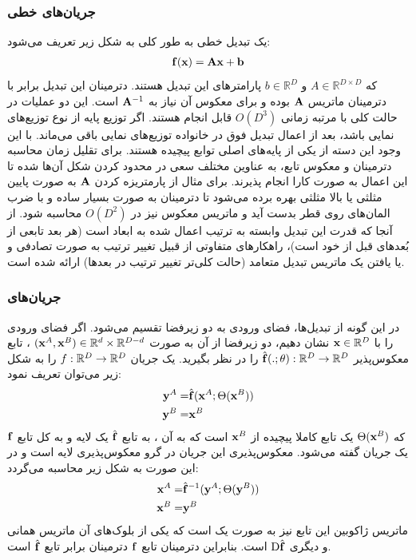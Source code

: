 \subsubsection{جریان‌های خطی}
یک تبدیل خطی به طور کلی به شکل زیر تعریف می‌شود:
\begin{align}
	{\bf f}({\bf x}) = {\bf A}{\bf x} + {\bf b}
\end{align}
که $A \in \mathbb{R}^{D \times D}$ و $b \in \mathbb{R}^D$ پارامتر‌های این تبدیل هستند. دترمینان این تبدیل برابر با دترمینان ماتریس ${\bf A}$ بوده و برای معکوس آن نیاز به ${\bf A}^{-1}$ است.
این دو عملیات در حالت کلی با مرتبه زمانی
$O(D^3)$
قابل انجام هستند. اگر توزیع پایه از نوع توزیع‌های نمایی باشد، بعد از اعمال تبدیل فوق در خانواده توزیع‌های نمایی باقی می‌ماند. با این وجود این دسته از یکی از پایه‌های اصلی توابع پیچیده هستند. برای تقلیل زمان محاسبه دترمینان و معکوس تابع، به عناوین مختلف سعی در محدود کردن شکل آن‌ها شده تا این اعمال به صورت کارا انجام پذیرند. برای مثال از پارمتریزه کردن ${\bf A}$ به صورت پایین مثلثی یا بالا مثلثی بهره برده می‌شود تا دترمینان به صورت بسیار ساده و با ضرب المان‌های روی قطر بدست آید و ماتریس معکوس نیز در $O(D^2)$ محاسبه شود. از آنجا که قدرت این تبدیل وابسته به ترتیب اعمال شده به ابعاد است (هر بعد تابعی از بُعدهای قبل از خود است)، راهکارهای متفاوتی از قبیل تغییر ترتیب به صورت تصادفی و یا یافتن یک ماتریس تبدیل متعامد (حالت کلی‌تر تغییر ترتیب در بعدها) ارائه شده است.
\subsubsection{جریان‌های
}
در این گونه از تبدیل‌ها، فضای ورودی به دو زیرفضا تقسیم می‌شود. اگر فضای ورودی را با
${\bf x} \in {\mathbb{R}}^D$
نشان دهیم، دو زیرفضا از آن به صورت
$({\bf x}^A, {\bf x}^B) \in {\mathbb{R}}^d \times {\mathbb{R}}^{D - d}$
، تابع معکوس‌پذیر
$\hat{{\bf f}}(.; \theta) : {\mathbb{R}}^D \rightarrow {\mathbb{R}}^D$
را در نظر بگیرید. یک جریان \coupling{}
$f : {\mathbb{R}}^D \rightarrow {\mathbb{R}}^D$
را به شکل زیر می‌توان تعریف نمود:
\begin{align}
	{\bf y}^A = & \hat{{\bf f}} ({\bf x}^A; \Theta({\bf x}^B))
	\nonumber
	\\
	{\bf y}^B = & {\bf x}^B
\end{align}
که $\Theta({\bf x}^B)$ یک تابع کاملا پیچیده از ${\bf x}^B$ است که به آن
، به تابع $\hat{{\bf f}}$ یک لایه \coupling{} و به کل تابع ${\bf f}$ یک جریان \coupling{} گفته می‌شود. معکوس‌پذیری این جریان در گرو معکوس‌پذیری لایه \coupling{} است و در این صورت به شکل زیر محاسبه می‌گردد:
\begin{align}
	{\bf x}^A = & \hat{{\bf f}}^{-1} ({\bf y}^A; \Theta({\bf y}^B))
	\nonumber
	\\
	{\bf x}^B = & {\bf y}^B
\end{align}
ماتریس ژاکوبین این تابع نیز به صورت یک
است که یکی از بلوک‌های آن ماتریس همانی و دیگری $\text{D}\hat{{\bf f}}$ است. بنابراین دترمینان  تابع ${\bf f}$ دترمینان برابر تابع $\hat{{\bf f}}$ است.

